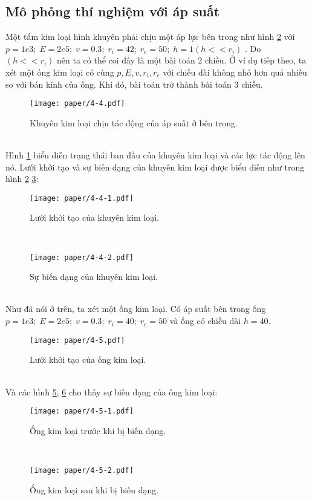 \documentclass[
12pt, %
oneside, %
english, %
onehalfspacing, %
nolistspacing, %
headsepline, %
addchap,
]{MastersDoctoralThesis} %
\begin{document}
\subsection{Mô phỏng thí nghiệm với áp suất}
Một tấm kim loại hình khuyên phải chịu một áp lực bên trong như hình \ref{fig:exam41} với $p=1e3;\;E=2e5;\;v=0.3;\;r_i=42;\;r_e=50;\;h=1 (h<<r_i)$ \cite{TIT-07}. Do $(h<<r_i)$ nên ta có thể coi đây là một bài toán 2 chiều. Ở ví dụ tiếp theo, ta xét một ống kim loại có cùng $p, E, v, r_i, r_e$ với chiều dài không nhỏ hơn quá nhiều so với bán kính của ống. Khi đó, bài toán trở thành bài toán 3 chiều.
\begin{figure}[http]
\centering
\texttt{[image: paper/4-4.pdf]}
\caption{Khuyên kim loại chịu tác động của áp suất ở bên trong.}
\label{fig:exam40}
\end{figure}\\
Hình \ref{fig:exam40} biểu diễn trạng thái ban đầu của khuyên kim loại và các lực tác động lên nó. Lưới khởi tạo và sự biến dạng của khuyên kim loại được biểu diễn như trong hình \ref{fig:exam41} \ref{fig:exam42}:
\begin{figure}[http]
\centering
\texttt{[image: paper/4-4-1.pdf]}
\caption{Lưới khởi tạo của khuyên kim loại.}
\label{fig:exam41}
\end{figure}\\
\begin{figure}[http]
\centering
\texttt{[image: paper/4-4-2.pdf]}
\caption{Sự biến dạng của khuyên kim loại.}
\label{fig:exam42}
\end{figure}\\
Như đã nói ở trên, ta xét một ống kim loại. Có áp suất bên trong ống $p=1e3;\;E=2e5;\;v=0.3;\;r_i=40;\;r_e=50$ và ống có chiều dài $h=40$.\\
\begin{figure}[http]
\centering
\texttt{[image: paper/4-5.pdf]}
\caption{Lưới khởi tạo của ống kim loại.}
\label{fig:exam50}
\end{figure}\\
Và các hình \ref{fig:exam51}, \ref{fig:exam52} cho thấy sự biến dạng của ống kim loại:
\begin{figure}[http]
\centering
\texttt{[image: paper/4-5-1.pdf]}
\caption{Ống kim loại trước khi bị biến dạng.}
\label{fig:exam51}
\end{figure}\\
\begin{figure}[http]
\centering
\texttt{[image: paper/4-5-2.pdf]}
\caption{Ống kim loại sau khi bị biến dạng.}
\label{fig:exam52}
\end{figure}\\
\end{document}
